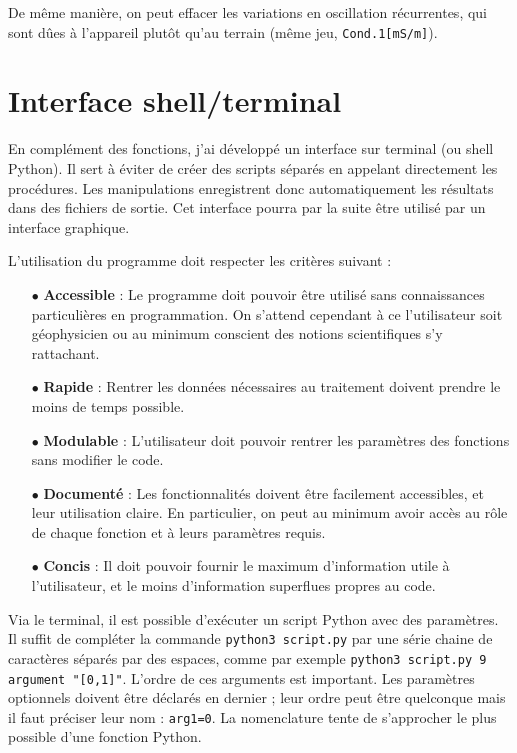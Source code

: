 \documentclass[12pt]{article}
\begin{document}
    De même manière, on peut effacer les variations en oscillation récurrentes, qui sont dûes à l'appareil plutôt qu'au terrain (même jeu, \texttt{Cond.1[mS/m]}).

\newpage
\section{Interface shell/terminal}

    En complément des fonctions, j'ai développé un interface sur terminal (ou shell Python). Il sert à éviter de créer des scripts séparés en appelant directement les procédures. Les manipulations enregistrent donc automatiquement les résultats dans des fichiers de sortie. Cet interface pourra par la suite être utilisé par un interface graphique.
    
    L'utilisation du programme doit respecter les critères suivant :
    \begin{enumerate}
        \item[$\bullet$] \textbf{Accessible} : Le programme doit pouvoir être utilisé sans connaissances particulières en programmation. On s'attend cependant à ce l'utilisateur soit géophysicien ou au minimum conscient des notions scientifiques  s'y rattachant.
        \item[$\bullet$] \textbf{Rapide} : Rentrer les données nécessaires au traitement doivent prendre le moins de temps possible.
        \item[$\bullet$] \textbf{Modulable} : L'utilisateur doit pouvoir rentrer les paramètres des fonctions sans modifier le code.
        \item[$\bullet$] \textbf{Documenté} : Les fonctionnalités doivent être facilement accessibles, et leur utilisation claire. En particulier, on peut au minimum avoir accès au rôle de chaque fonction et à leurs paramètres requis.
        \item[$\bullet$] \textbf{Concis} : Il doit pouvoir fournir le maximum d'information utile à l'utilisateur, et le moins d'information superflues propres au code.
    \end{enumerate}

    Via le terminal, il est possible d'exécuter un script Python avec des paramètres. Il suffit de compléter la commande \texttt{python3 script.py} par une série chaine de caractères séparés par des espaces, comme par exemple \texttt{python3 script.py 9 argument "[0,1]"}. L'ordre de ces arguments est important. Les paramètres optionnels doivent être déclarés en dernier ; leur ordre peut être quelconque mais il faut préciser leur nom : \texttt{arg1=0}. La nomenclature tente de s'approcher le plus possible d'une fonction Python.
\end{document}
